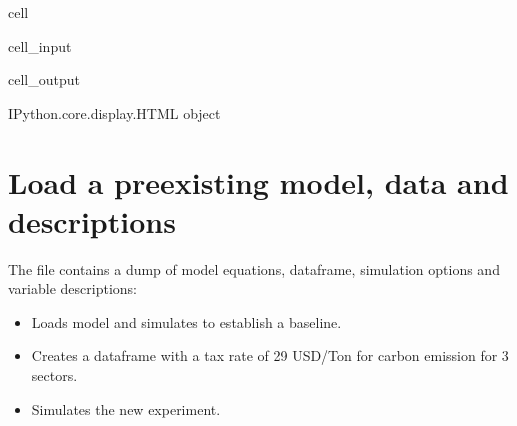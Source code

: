 \documentclass[letterpaper,10pt,english]{jupyterBook}
\begin{document}
\begin{sphinxuseclass}{cell}\begin{sphinxVerbatimInput}

\begin{sphinxuseclass}{cell_input}
\begin{sphinxVerbatim}[commandchars=\\\{\}]
    


\end{sphinxVerbatim}

\end{sphinxuseclass}\end{sphinxVerbatimInput}
\begin{sphinxVerbatimOutput}

\begin{sphinxuseclass}{cell_output}
\begin{sphinxVerbatim}[commandchars=\\\{\}]
\PYGZlt{}IPython.core.display.HTML object\PYGZgt{}
\end{sphinxVerbatim}

\end{sphinxuseclass}\end{sphinxVerbatimOutput}

\end{sphinxuseclass}

\section{Load a pre\sphinxhyphen{}existing model, data and descriptions}
\label{\detokenize{content/howto/attribution/Attribution background:load-a-pre-existing-model-data-and-descriptions}}
\sphinxAtStartPar
The file  contains a dump of model equations, dataframe, simulation options and variable descriptions:
\begin{itemize}
\item {} 
\sphinxAtStartPar
Loads model and simulates to establish a baseline.

\item {} 
\sphinxAtStartPar
Creates a dataframe with a tax rate of 29 USD/Ton for carbon emission for 3 sectors.

\item {} 
\sphinxAtStartPar
Simulates the new experiment.

\end{itemize}
\end{document}
